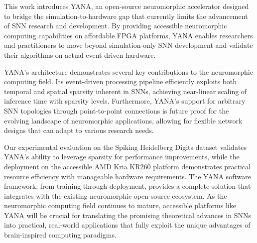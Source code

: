 This work introduces YANA, an open-source neuromorphic accelerator designed to bridge the simulation-to-hardware gap that currently limits the advancement of \ac{SNN} research and development. By providing accessible neuromorphic computing capabilities on affordable FPGA platforms, YANA enables researchers and practitioners to move beyond simulation-only SNN development and validate their algorithms on actual event-driven hardware.

YANA's architecture demonstrates several key contributions to the neuromorphic computing field. Its event-driven processing pipeline efficiently exploits both temporal and spatial sparsity inherent in SNNs, achieving near-linear scaling of inference time with sparsity levels.
Furthermore, YANA's support for arbitrary SNN topologies through point-to-point connections is future proof for the evolving landscape of neuromorphic applications, allowing for flexible network designs that can adapt to various research needs.

Our experimental evaluation on the Spiking Heidelberg Digits dataset validates YANA's ability to leverage sparsity for performance improvements, while the deployment on the accessible AMD Kria KR260 platform demonstrates practical resource efficiency with manageable hardware requirements. The YANA software framework, from training through deployment, provides a complete solution that integrates with the existing neuromorphic open-source ecosystem.
As the neuromorphic computing field continues to mature, accessible platforms like YANA will be crucial for translating the promising theoretical advances in SNNs into practical, real-world applications that fully exploit the unique advantages of brain-inspired computing paradigms.